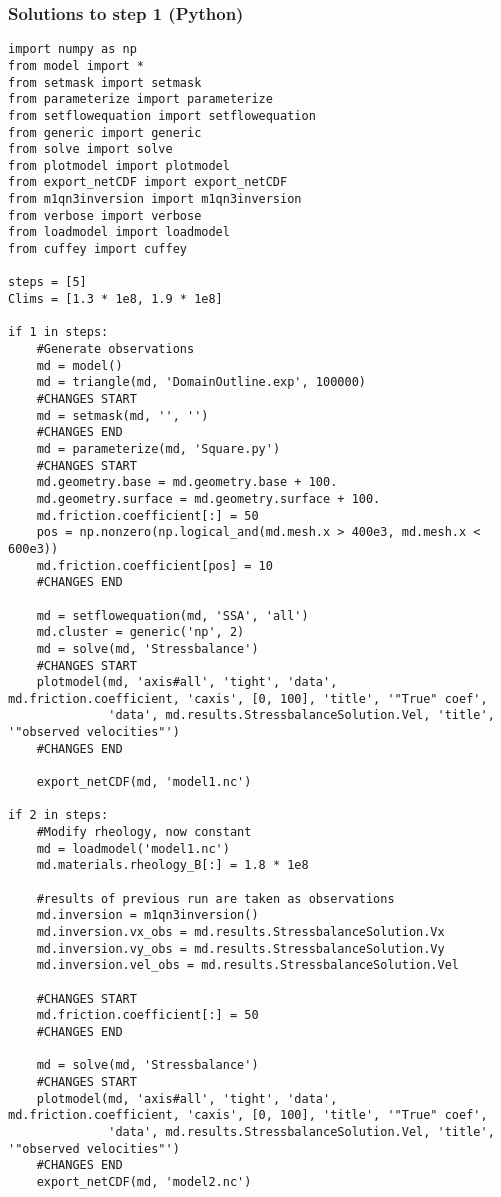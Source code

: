 \subsubsection{Solutions to step 1 (Python)}
\begin{verbatim}import numpy as np
from model import *
from setmask import setmask
from parameterize import parameterize
from setflowequation import setflowequation
from generic import generic
from solve import solve
from plotmodel import plotmodel
from export_netCDF import export_netCDF
from m1qn3inversion import m1qn3inversion
from verbose import verbose
from loadmodel import loadmodel
from cuffey import cuffey

steps = [5]
Clims = [1.3 * 1e8, 1.9 * 1e8]

if 1 in steps:
    #Generate observations
    md = model()
    md = triangle(md, 'DomainOutline.exp', 100000)
    #CHANGES START
    md = setmask(md, '', '')
    #CHANGES END
    md = parameterize(md, 'Square.py')
    #CHANGES START
    md.geometry.base = md.geometry.base + 100.
    md.geometry.surface = md.geometry.surface + 100.
    md.friction.coefficient[:] = 50
    pos = np.nonzero(np.logical_and(md.mesh.x > 400e3, md.mesh.x < 600e3))
    md.friction.coefficient[pos] = 10
    #CHANGES END

    md = setflowequation(md, 'SSA', 'all')
    md.cluster = generic('np', 2)
    md = solve(md, 'Stressbalance')
    #CHANGES START
    plotmodel(md, 'axis#all', 'tight', 'data', md.friction.coefficient, 'caxis', [0, 100], 'title', '"True" coef',
              'data', md.results.StressbalanceSolution.Vel, 'title', '"observed velocities"')
    #CHANGES END

    export_netCDF(md, 'model1.nc')

if 2 in steps:
    #Modify rheology, now constant
    md = loadmodel('model1.nc')
    md.materials.rheology_B[:] = 1.8 * 1e8

    #results of previous run are taken as observations
    md.inversion = m1qn3inversion()
    md.inversion.vx_obs = md.results.StressbalanceSolution.Vx
    md.inversion.vy_obs = md.results.StressbalanceSolution.Vy
    md.inversion.vel_obs = md.results.StressbalanceSolution.Vel

    #CHANGES START
    md.friction.coefficient[:] = 50
    #CHANGES END

    md = solve(md, 'Stressbalance')
    #CHANGES START
    plotmodel(md, 'axis#all', 'tight', 'data', md.friction.coefficient, 'caxis', [0, 100], 'title', '"True" coef',
              'data', md.results.StressbalanceSolution.Vel, 'title', '"observed velocities"')
    #CHANGES END
    export_netCDF(md, 'model2.nc')



\end{verbatim}

